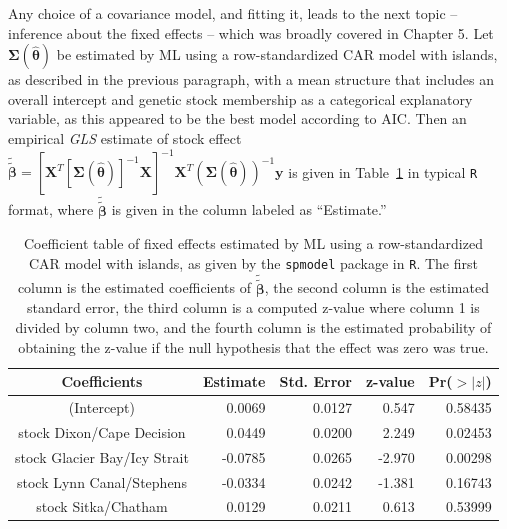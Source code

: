 \documentclass[12pt, titlepage]{article}
\begin{document}
Any choice of a covariance model, and fitting it, leads to the next topic -- inference about the fixed effects -- which was broadly covered in Chapter 5.  Let $\boldsymbol{\Sigma}(\hat{\boldsymbol{\theta}})$ be estimated by ML using a row-standardized CAR model with islands, as described in the previous paragraph, with a mean structure that includes an overall intercept and genetic stock membership as a categorical explanatory variable, as this appeared to be the best model according to AIC. Then an empirical \textit{GLS} estimate of stock effect $\tilde{\tilde{\boldsymbol{\beta}}} = [\mathbf{X}^{T}[\boldsymbol{\Sigma}(\hat{\boldsymbol{\theta}})]^{-1}\mathbf{X}]^{-1}\mathbf{X}^{T}(\boldsymbol{\Sigma}(\hat{\boldsymbol{\theta}}))^{-1}\mathbf{y}$ is given in Table~\ref{tab:stockFE} in typical \texttt{R} format, where $\tilde{\tilde{\boldsymbol{\beta}}}$ is given in the column labeled as ``Estimate.''
\begin{table}[H] 
	\caption{Coefficient table of fixed effects estimated by ML using a row-standardized CAR model with islands, as given by the \texttt{spmodel} package in \texttt{R}.  The first column is the estimated coefficients of $\tilde{\tilde{\boldsymbol{\beta}}}$, the second column is the estimated standard error, the third column is a computed z-value where column 1 is divided by column two, and the fourth column is the estimated probability of obtaining the z-value if the null hypothesis that the effect was zero was true.  \label{tab:stockFE}}
\begin{center}
\begin{tabular}{|c|rrrr|}
  \hline
  \hline{}
  Coefficients & Estimate & Std. Error & z-value & Pr($>|z|$) \\
	\hline
  \hline
(Intercept) & 0.0069 & 0.0127 & 0.547 & 0.58435 \\ 
  stock Dixon/Cape Decision & 0.0449 & 0.0200 & 2.249 & 0.02453 \\ 
  stock Glacier Bay/Icy Strait & -0.0785 & 0.0265 & -2.970 & 0.00298 \\ 
  stock Lynn Canal/Stephens & -0.0334 & 0.0242 & -1.381 & 0.16743 \\ 
  stock Sitka/Chatham & 0.0129 & 0.0211 & 0.613 & 0.53999 \\ 
  \hline
  \hline
\end{tabular}
\end{center}
\end{table}
\end{document}
